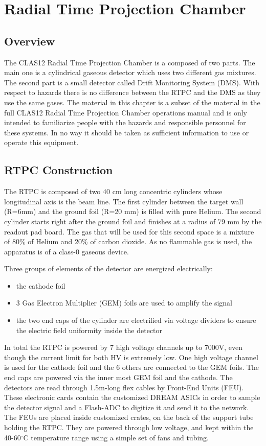 \section{Radial Time Projection Chamber}

\subsection{Overview}
The CLAS12 Radial Time Projection Chamber is a composed of two parts. The main one is a cylindrical gaseous detector which uses two different gas mixtures. The second part is a small detector called Drift Monitoring System (DMS). With respect to hazards there is no difference between the RTPC and the DMS as they use the same gases.
The material in this chapter is a subset of the material in the full CLAS12 Radial Time Projection Chamber operations manual and is only intended to familiarize people with the hazards and responsible personnel for these systems. In no way it should be taken as sufficient information to use or operate this equipment.

\subsection{RTPC Construction}
The RTPC is composed of two 40 cm long concentric cylinders whose longitudinal axis is the beam line. The first cylinder between the target wall (R=6mm) and the ground foil (R=20 mm) is filled with pure Helium. The second cylinder starts right after the ground foil and finishes at a radius of 79 mm by the readout pad board. The gas that will be used for this second space is a mixture of 80\% of Helium and 20\% of carbon dioxide. As no flammable gas is used, the apparatus is of a class-0 gaseous device. 

Three groups of elements of the detector are energized electrically:
\begin{itemize}
\item the cathode foil
\item 3 Gas Electron Multiplier (GEM) foils are used to amplify the signal
\item the two end caps of the cylinder are electrified via voltage dividers to ensure the electric field uniformity inside the detector
\end{itemize}

In total the RTPC is powered by 7 high voltage channels up to 7000V, even though the current limit for both HV is extremely low. One high voltage channel is used for the cathode foil and the 6 others are connected to the GEM foils. The end caps are powered via the inner most GEM foil and the cathode. The detectors are read through 1.5m-long flex cables by Front-End Units (FEU). These electronic cards contain the customized DREAM ASICs in order to sample the detector signal and a Flash-ADC to digitize it and send it to the network. The FEUs are placed inside customized crates, on the back of the support tube holding the RTPC. They are powered through low voltage, and kept within the 40-60$^\circ$C temperature range using a simple set of fans and tubing.

